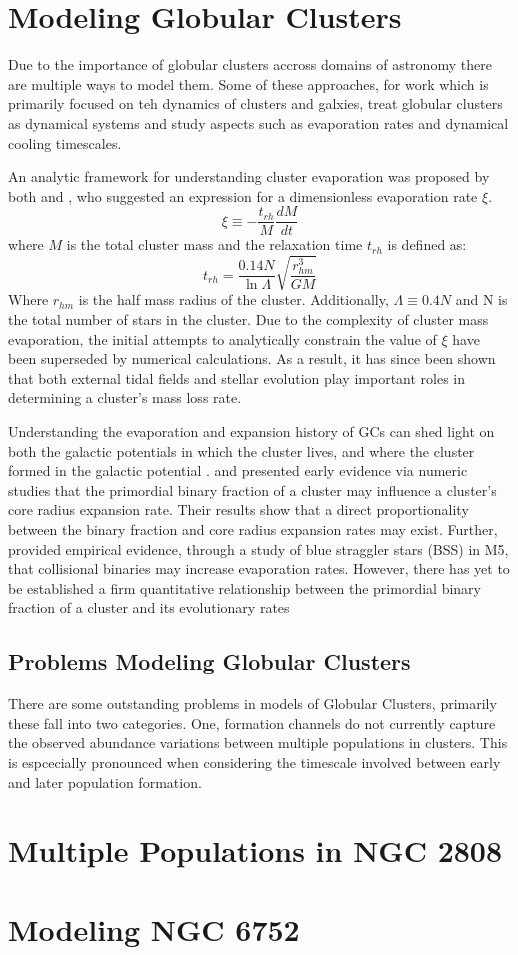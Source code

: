 \chapter{Modeling Globular Clusters}
Due to the importance of globular clusters accross domains of astronomy 
there are multiple ways to model them. Some of these approaches, for work
which is primarily focused on teh dynamics of clusters and galxies, treat
globular clusters as dynamical systems and study aspects such as evaporation rates
and dynamical cooling timescales. 

An analytic framework for understanding cluster evaporation was proposed by
both \citet{Amb38} and \citet{Spi40}, who suggested an expression for a
dimensionless evaporation rate $\xi$.
\begin{equation}
    \xi \equiv -\frac{t_{rh}}{M}\frac{dM}{dt}
\end{equation}
where $M$ is the total cluster mass and the relaxation time $t_{rh}$ is defined as:
\begin{equation}
    t_{rh} = \frac{0.14 N}{\ln\Lambda}\sqrt{\frac{r^{3}_{hm}}{GM}}
\end{equation}
Where $r_{hm}$ is the half mass radius of the cluster. Additionally, $\Lambda
\equiv 0.4N$ and N is the total number of stars in the cluster. Due to the
complexity of cluster mass evaporation, the initial attempts to analytically
constrain the value of $\xi$ have been superseded by numerical calculations. As
a result, it has since been shown that both external tidal fields \citep{Mad17,
Bau03} and stellar evolution \citep{Bau03} play important roles in determining
a cluster's mass loss rate.

Understanding the evaporation and expansion history of GCs can shed light on
both the galactic potentials in which the cluster lives, and where the cluster
formed in the galactic potential \citep{Ren17}. \citet{Wil03} and \citet{Gon05}
presented early evidence via numeric studies that the primordial binary
fraction of a cluster may influence a cluster's core radius expansion rate.
Their results show that a direct proportionality between the binary fraction
and core radius expansion rates may exist. Further, \citet{Lan07} provided
empirical evidence, through a study of blue straggler stars (BSS) in M5, that
collisional binaries may increase evaporation rates. However, there has yet to
be established a firm quantitative relationship between the primordial binary
fraction of a cluster and its evolutionary rates


\section{Problems Modeling Globular Clusters}
There are some outstanding problems in models of Globular Clusters, primarily
these fall into two categories. One, formation channels do not currently capture
the observed abundance variations between multiple populations in clusters. This
is espcecially pronounced when considering the timescale involved between early 
and later population formation. 



\chapter{Multiple Populations in NGC 2808}

\chapter{Modeling NGC 6752}
